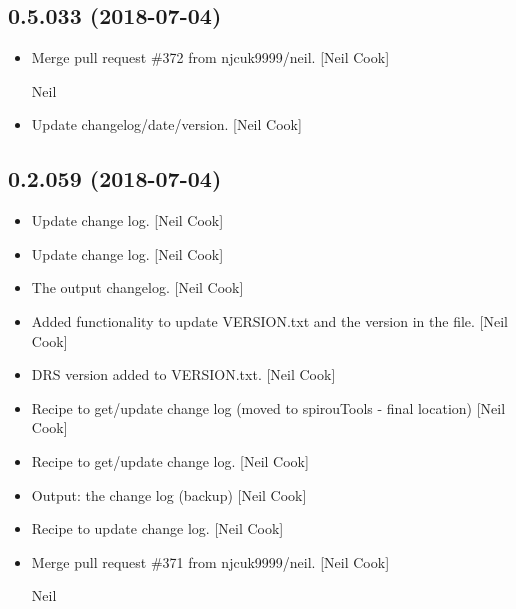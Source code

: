 \documentclass[a4paper,10pt,english]{report}
\begin{document}
\subsection{0.5.033 (2018-07-04)}
\label{\detokenize{misc/changelog:id400}}\begin{itemize}
\item {} 
Merge pull request \#372 from njcuk9999/neil. {[}Neil Cook{]}

Neil

\item {} 
Update changelog/date/version. {[}Neil Cook{]}

\end{itemize}


\subsection{0.2.059 (2018-07-04)}
\label{\detokenize{misc/changelog:id401}}\begin{itemize}
\item {} 
Update change log. {[}Neil Cook{]}

\item {} 
Update change log. {[}Neil Cook{]}

\item {} 
The output changelog. {[}Neil Cook{]}

\item {} 
Added functionality to update VERSION.txt and the version in the
 file. {[}Neil Cook{]}

\item {} 
DRS version added to VERSION.txt. {[}Neil Cook{]}

\item {} 
Recipe to get/update change log (moved to spirouTools - final
location) {[}Neil Cook{]}

\item {} 
Recipe to get/update change log. {[}Neil Cook{]}

\item {} 
Output: the change log (backup) {[}Neil Cook{]}

\item {} 
Recipe to update change log. {[}Neil Cook{]}

\item {} 
Merge pull request \#371 from njcuk9999/neil. {[}Neil Cook{]}

Neil

\end{itemize}
\end{document}
